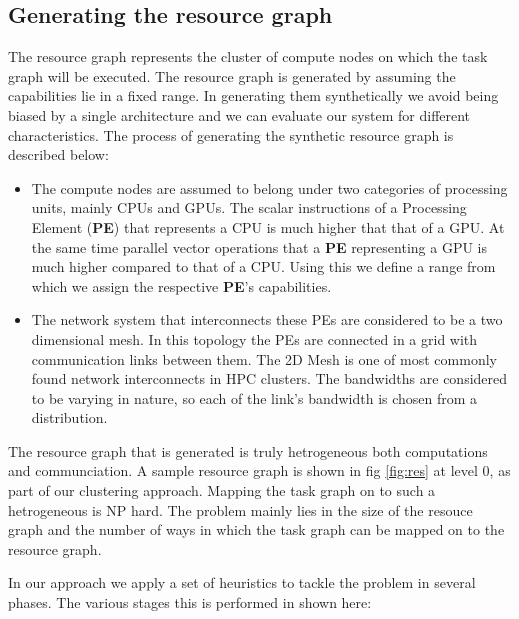 \subsection{Generating the resource graph}
\label{sec:gener-reso-graph}

The resource graph represents the cluster of compute nodes on which
the task graph will be executed. The resource graph is generated
by assuming the capabilities lie in a fixed range. In generating
them synthetically we avoid being biased by a single architecture and
we can evaluate our system for different characteristics. The process
of generating the synthetic resource graph is described below:

\begin{itemize}

\item The compute nodes are assumed to belong under two categories of
processing units, mainly CPUs and GPUs. The scalar instructions of a
Processing Element (\textbf{PE}) that represents a CPU is much higher
that that of a GPU. At the same time parallel vector operations that a
\textbf{PE} representing a GPU is much higher compared to that of a
CPU. Using this we define a range from which we assign the respective
\textbf{PE}'s capabilities.

\item The network system that interconnects these PEs are considered
to be a two dimensional mesh. In this topology the PEs are connected
in a grid with communication links between them. The 2D Mesh is one of
most commonly found network interconnects in HPC clusters. The
bandwidths are considered to be varying in nature, so each of the
link's bandwidth is chosen from a distribution.

\end{itemize}

The resource graph that is generated is truly hetrogeneous both
computations and communciation. A sample resource graph is shown in
fig \ref{fig:res} at level 0, as part of our clustering approach.
Mapping the task graph on to such a hetrogeneous is NP hard. The
problem mainly lies in the size of the resouce graph and the number of
ways in which the task graph can be mapped on to the resource graph.

In our approach we apply a set of heuristics to tackle the problem in
several phases. The various stages this is performed in shown here:

